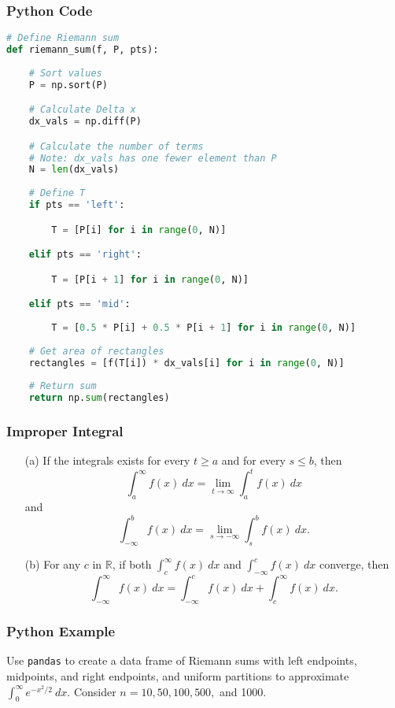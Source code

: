 \documentclass{beamer}
\begin{document}
\begin{frame}[fragile]
\frametitle{Python Code}

\begin{lstlisting}[language=Python]
# Define Riemann sum
def riemann_sum(f, P, pts):
    
    # Sort values
    P = np.sort(P)

    # Calculate Delta x
    dx_vals = np.diff(P)

    # Calculate the number of terms
    # Note: dx_vals has one fewer element than P
    N = len(dx_vals)
    
    # Define T
    if pts == 'left':

        T = [P[i] for i in range(0, N)]

    elif pts == 'right':

        T = [P[i + 1] for i in range(0, N)]

    elif pts == 'mid':
        
        T = [0.5 * P[i] + 0.5 * P[i + 1] for i in range(0, N)]
        
    # Get area of rectangles
    rectangles = [f(T[i]) * dx_vals[i] for i in range(0, N)]
    
    # Return sum
    return np.sum(rectangles)
\end{lstlisting}
\end{frame}

\begin{frame}
\frametitle{Improper Integral}
\begin{Definition}
{
\linespread{0.5}
\begin{enumerate}
\item[(a)] If the integrals exists for every $t \geq a$ and for every $s \leq b$, then
$$
\int_a^\infty f(x)\ dx = \lim_{t\to\infty}\int_a^t f(x)\ dx
$$
and
$$
\int_{-\infty}^b f(x)\ dx = \lim_{s\to-\infty}\int_s^b f(x)\ dx.
$$
\item[(b)] For any $c$ in $\mathbb{R}$, if both $\displaystyle\int_c^\infty f(x)\ dx$ and $\displaystyle\int_{-\infty}^c f(x)\ dx$ converge, then 
$$
\int_{-\infty}^\infty f(x)\ dx = \int_{-\infty}^c f(x)\ dx + \int_c^\infty f(x)\ dx.
$$
\end{enumerate}
}
\end{Definition}
\end{frame}

\begin{frame}[t]
\frametitle{Python Example}
\begin{Example}
Use \texttt{pandas} to create a data frame of Riemann sums with left endpoints, midpoints, and right endpoints, and uniform partitions to approximate $\displaystyle\int_0^\infty e^{-x^2/2}\ dx$. Consider $n = 10, 50, 100, 500,$ and 1000.
\end{Example}
\end{frame}
\end{document}
